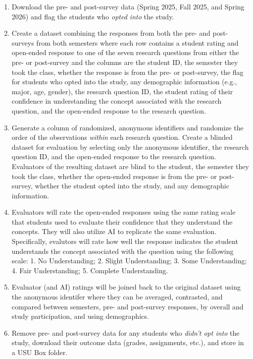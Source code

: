 \documentclass[
  12pt]{article}
\providecommand{\tightlist}{%
  \setlength{\itemsep}{0pt}\setlength{\parskip}{0pt}}
\begin{document}
\begin{enumerate}
\def\labelenumi{\arabic{enumi}.}
\tightlist
\item
  Download the pre- and post-survey data (Spring 2025, Fall 2025, and
  Spring 2026) and flag the students who \emph{opted into} the study.
\item
  Create a dataset combining the responses from both the pre- and
  post-surveys from both semesters where each row contains a student
  rating and open-ended response to one of the seven research questions
  from either the pre- or post-survey and the columns are the student
  ID, the semester they took the class, whether the response is from the
  pre- or post-survey, the flag for students who opted into the study,
  any demographic information (e.g., major, age, gender), the research
  question ID, the student rating of their confidence in understanding
  the concept associated with the research question, and the open-ended
  response to the research question.
\item
  Generate a column of randomized, anonymous identifiers and randomize
  the order of the observations \emph{within} each research question.
  Create a blinded dataset for evaluation by selecting only the
  anonymous identifier, the research question ID, and the open-ended
  response to the research question. Evaluators of the resulting dataset
  are blind to the student, the semester they took the class, whether
  the open-ended response is from the pre- or post-survey, whether the
  student opted into the study, and any demographic information.
\item
  Evaluators will rate the open-ended responses using the same rating
  scale that students used to evaluate their confidence that they
  understand the concepts. They will also utilize AI to replicate the
  same evaluation. Specifically, evalutors will rate how well the
  response indicates the student understands the concept associated with
  the question using the following scale: 1. No Understanding; 2. Slight
  Understanding; 3. Some Understanding; 4. Fair Understanding; 5.
  Complete Understanding.
\item
  Evaluator (and AI) ratings will be joined back to the original dataset
  using the anonymous identifer where they can be averaged, contrasted,
  and compared between semesters, pre- and post-survey responses, by
  overall and study participation, and using demographics.
\item
  Remove pre- and post-survey data for any students who \emph{didn't opt
  into} the study, download their outcome data (grades, assignments,
  etc.), and store in a USU Box folder.
\end{enumerate}
\end{document}
